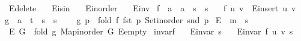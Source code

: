 \begin{isabellebody}
\ \ E{\isacharunderscore}{\kern0pt}delete\ \isanewline
\ \ E{\isacharunderscore}{\kern0pt}isin\ \isanewline
\ \ E{\isacharunderscore}{\kern0pt}inorder\ \isanewline
\ \ E{\isacharunderscore}{\kern0pt}inv\isanewline
{}\isanewline
\isanewline
{}\isamarkupfalse%
\ f\ {\isacharcolon}{\kern0pt}{\isacharcolon}{\kern0pt}\ {\isachardoublequoteopen}{\isacharprime}{\kern0pt}a\ {\isasymRightarrow}\ {\isacharprime}{\kern0pt}a\ {\isasymRightarrow}\ {\isacharprime}{\kern0pt}s\ {\isasymRightarrow}\ {\isacharprime}{\kern0pt}s{\isachardoublequoteclose}\ \isanewline
\ \ {\isachardoublequoteopen}f\ u\ v\ {\isasymequiv}\ E{\isacharunderscore}{\kern0pt}insert\ {\isacharparenleft}{\kern0pt}u{\isacharcomma}{\kern0pt}\ v{\isacharparenright}{\kern0pt}{\isachardoublequoteclose}\isanewline
\isanewline
{}\isamarkupfalse%
\ g\ {\isacharcolon}{\kern0pt}{\isacharcolon}{\kern0pt}\ {\isachardoublequoteopen}{\isacharprime}{\kern0pt}a\ {\isasymtimes}\ {\isacharprime}{\kern0pt}t\ {\isasymRightarrow}\ {\isacharprime}{\kern0pt}s\ {\isasymRightarrow}\ {\isacharprime}{\kern0pt}s{\isachardoublequoteclose}\ \ \isanewline
\ \ {\isachardoublequoteopen}g\ p\ {\isasymequiv}\ fold\ {\isacharparenleft}{\kern0pt}f\ {\isacharparenleft}{\kern0pt}fst\ p{\isacharparenright}{\kern0pt}{\isacharparenright}{\kern0pt}\ {\isacharparenleft}{\kern0pt}Set{\isacharunderscore}{\kern0pt}inorder\ {\isacharparenleft}{\kern0pt}snd\ p{\isacharparenright}{\kern0pt}{\isacharparenright}{\kern0pt}{\isachardoublequoteclose}\isanewline
\isanewline
{}\isamarkupfalse%
\ E\ {\isacharcolon}{\kern0pt}{\isacharcolon}{\kern0pt}\ {\isachardoublequoteopen}{\isacharprime}{\kern0pt}m\ {\isasymRightarrow}\ {\isacharprime}{\kern0pt}s{\isachardoublequoteclose}\ \isanewline
\ \ {\isachardoublequoteopen}E\ G\ {\isasymequiv}\ fold\ g\ {\isacharparenleft}{\kern0pt}Map{\isacharunderscore}{\kern0pt}inorder\ G{\isacharparenright}{\kern0pt}\ E{\isacharunderscore}{\kern0pt}empty{\isachardoublequoteclose}\isanewline
\isanewline
{}\isamarkupfalse%
\ invar{\isacharunderscore}{\kern0pt}f{\isacharcolon}{\kern0pt}\isanewline
\ \ \ {\isachardoublequoteopen}E{\isachardot}{\kern0pt}invar\ s{\isachardoublequoteclose}\isanewline
\ \ \ {\isachardoublequoteopen}E{\isachardot}{\kern0pt}invar\ {\isacharparenleft}{\kern0pt}f\ u\ v\ s{\isacharparenright}{\kern0pt}{\isachardoublequoteclose}%
\endisataginvisible
{\isafoldinvisible}%

\end{isabellebody}
